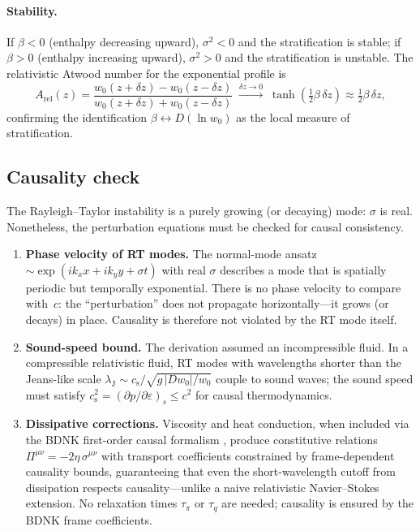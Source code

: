 \paragraph{Stability.}
If $\beta<0$ (enthalpy decreasing upward), $\sigma^{2}<0$ and the
stratification is stable; if $\beta>0$ (enthalpy increasing upward),
$\sigma^{2}>0$ and the stratification is unstable.  The relativistic
Atwood number for the exponential profile is
\begin{equation}
\label{eq:rel-10-31}
A_{\mathrm{rel}}(z)
= \frac{w_{0}(z+\delta z)-w_{0}(z-\delta z)}
       {w_{0}(z+\delta z)+w_{0}(z-\delta z)}
\;\xrightarrow{\delta z\to 0}\;
\tanh\!\left(\tfrac{1}{2}\beta\,\delta z\right)
\approx \tfrac{1}{2}\beta\,\delta z,
\end{equation}
confirming the identification $\beta \leftrightarrow D(\ln w_{0})$ as the
local measure of stratification.

\subsection{Causality check}
\label{sec:rel-92-causality}

The Rayleigh--Taylor instability is a purely growing (or decaying) mode:
$\sigma$ is real.  Nonetheless, the perturbation equations must be
checked for causal consistency.

\begin{enumerate}
\item \textbf{Phase velocity of RT modes.}  The normal-mode ansatz
  $\sim\exp(ik_{x}x+ik_{y}y+\sigma t)$ with real $\sigma$ describes a
  mode that is spatially periodic but temporally exponential.  There is
  no phase velocity to compare with~$c$: the ``perturbation'' does not
  propagate horizontally---it grows (or decays) in place.  Causality is
  therefore not violated by the RT mode itself.

\item \textbf{Sound-speed bound.}  The derivation assumed an
  incompressible fluid.  In a compressible relativistic fluid, RT modes
  with wavelengths shorter than the Jeans-like scale
  $\lambda_{\mathrm{J}} \sim c_{\mathrm{s}}/\sqrt{g\,|Dw_{0}|/w_{0}}$
  couple to sound waves; the sound speed must satisfy
  $c_{\mathrm{s}}^{2} = (\partial p/\partial\varepsilon)_{s} \le c^{2}$
  for causal thermodynamics.

\item \textbf{Dissipative corrections.}  Viscosity and heat conduction,
  when included via the BDNK first-order causal formalism
  \citep{BemficaDN2018,Kovtun2019}, produce constitutive relations
  $\Pi^{\mu\nu}=-2\eta\,\sigma^{\mu\nu}$ with transport coefficients
  constrained by frame-dependent causality bounds, guaranteeing that
  even the short-wavelength cutoff from dissipation respects
  causality---unlike a naive relativistic Navier--Stokes extension.
  No relaxation times $\tau_\pi$ or $\tau_q$ are needed; causality is
  ensured by the BDNK frame coefficients.
\end{enumerate}

